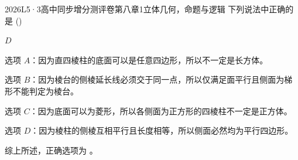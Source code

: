 
\begin{problem}{2026}{L}{5·3高中同步增分测评卷第八章}{1}{立体几何，命题与逻辑}
下列说法中正确的是 (\hspace{1cm})
\begin{choices}
\end{choices}
\end{problem}

\begin{answer}
$D$
\end{answer}

\begin{solutions}
选项 $A$：因为直四棱柱的底面可以是任意四边形，所以不一定是长方体。

选项 $B$：因为棱台的侧棱延长线必须交于同一点，所以仅满足面平行且侧面为梯形不能判定为棱台。

选项 $C$：因为底面可以为菱形，所以各侧面为正方形的四棱柱不一定是正方体。

选项 $D$：因为棱柱的侧棱互相平行且长度相等，所以侧面必然均为平行四边形。

综上所述，正确选项为 。
\end{solutions}